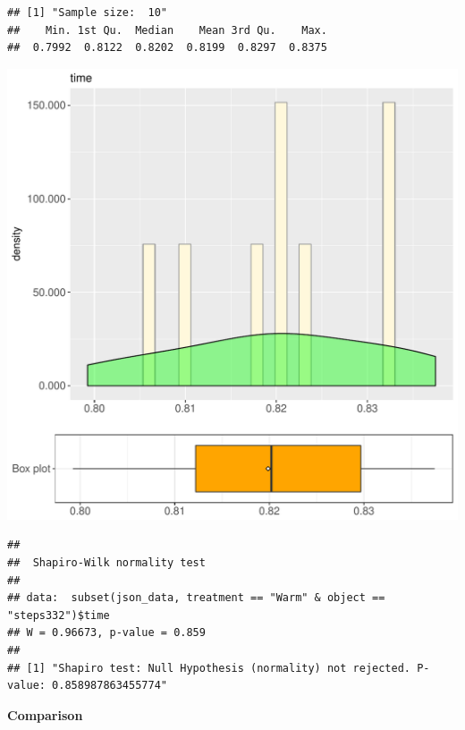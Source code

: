 \documentclass{article}\usepackage[]{graphicx}\usepackage[]{color}
\makeatletter
\def\maxwidth{ %
  \ifdim\Gin@nat@width>\linewidth
    \linewidth
  \else
    \Gin@nat@width
  \fi
}
\newenvironment{kframe}{%
 \def\at@end@of@kframe{}%
 \ifinner\ifhmode%
  \def\at@end@of@kframe{\end{minipage}}%
  \begin{minipage}{\columnwidth}%
 \fi\fi%
 \def\FrameCommand##1{\hskip\@totalleftmargin \hskip-\fboxsep
 \colorbox{shadecolor}{##1}\hskip-\fboxsep
     \hskip-\linewidth \hskip-\@totalleftmargin \hskip\columnwidth}%
 \MakeFramed {\advance\hsize-\width
   \@totalleftmargin\z@ \linewidth\hsize
   \@setminipage}}%
 {\par\unskip\endMakeFramed%
 \at@end@of@kframe}
\newenvironment{knitrout}{}{} %
\makeatother
\begin{document}
\begin{knitrout}
\color{fgcolor}\begin{kframe}
\begin{verbatim}
## [1] "Sample size:  10"
##    Min. 1st Qu.  Median    Mean 3rd Qu.    Max. 
##  0.7992  0.8122  0.8202  0.8199  0.8297  0.8375
\end{verbatim}
\end{kframe}
\includegraphics[width=\maxwidth]{figure/RH1_Warm_steps332-1} 
\begin{kframe}\begin{verbatim}
## 
## 	Shapiro-Wilk normality test
## 
## data:  subset(json_data, treatment == "Warm" & object == "steps332")$time
## W = 0.96673, p-value = 0.859
## 
## [1] "Shapiro test: Null Hypothesis (normality) not rejected. P-value: 0.858987863455774"
\end{verbatim}
\end{kframe}
\end{knitrout}
  
 \textbf{Comparison}
  
\end{document}

